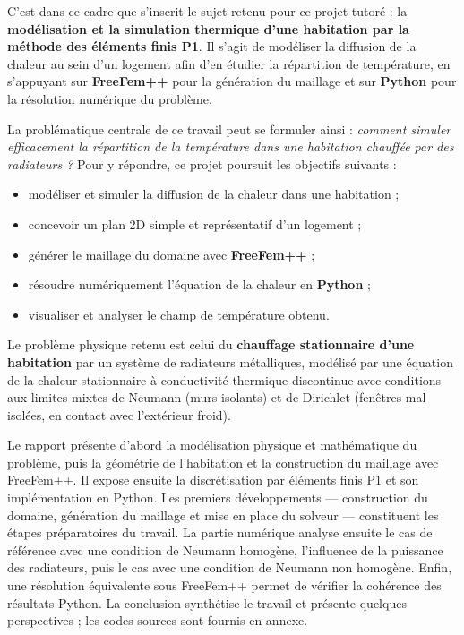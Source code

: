 \documentclass[12pt,a4paper]{article}
\begin{document}
	C'est dans ce cadre que s'inscrit le sujet retenu pour ce projet tutoré : la \textbf{modélisation et la simulation thermique d'une habitation par la méthode des éléments finis P1}. Il s'agit de modéliser la diffusion de la chaleur au sein d'un logement afin d'en étudier la répartition de température, en s'appuyant sur \textbf{FreeFem++} pour la génération du maillage et sur \textbf{Python} pour la résolution numérique du problème.
	
	La problématique centrale de ce travail peut se formuler ainsi : \emph{comment simuler efficacement la répartition de la température dans une habitation chauffée par des radiateurs ?} Pour y répondre, ce projet poursuit les objectifs suivants :
	
	\begin{itemize}
		\item modéliser et simuler la diffusion de la chaleur dans une habitation ;
		\item concevoir un plan 2D simple et représentatif d'un logement ;
		\item générer le maillage du domaine avec \textbf{FreeFem++} ;
		\item résoudre numériquement l'équation de la chaleur en \textbf{Python} ;
		\item visualiser et analyser le champ de température obtenu.
	\end{itemize}
	
	Le problème physique retenu est celui du \textbf{chauffage stationnaire d'une habitation} par un système de radiateurs métalliques, modélisé par une équation de la chaleur stationnaire à conductivité thermique discontinue avec conditions aux limites mixtes de Neumann (murs isolants) et de Dirichlet (fenêtres mal isolées, en contact avec l'extérieur froid).
	
	Le rapport présente d'abord la modélisation physique et mathématique du problème, puis la géométrie de l'habitation et la construction du maillage avec FreeFem++. Il expose ensuite la discrétisation par éléments finis P1 et son implémentation en Python. Les premiers développements — construction du domaine, génération du maillage et mise en place du solveur — constituent les étapes préparatoires du travail. La partie numérique analyse ensuite le cas de référence avec une condition de Neumann homogène, l'influence de la puissance des radiateurs, puis le cas avec une condition de Neumann non homogène. Enfin, une résolution équivalente sous FreeFem++ permet de vérifier la cohérence des résultats Python. La conclusion synthétise le travail et présente quelques perspectives ; les codes sources sont fournis en annexe.
	
\end{document}
